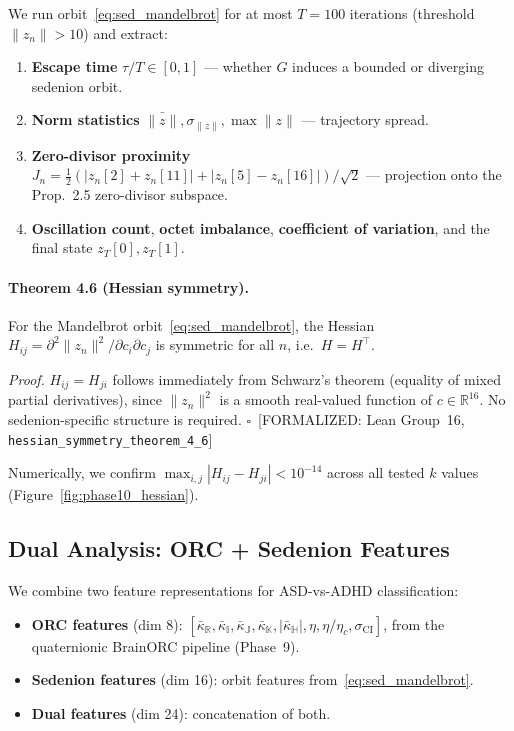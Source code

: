 \documentclass[11pt,a4paper]{article}
\begin{document}
We run orbit~\eqref{eq:sed_mandelbrot} for at most $T=100$ iterations (threshold $\|z_n\| > 10$) and extract:
\begin{enumerate}
\item \textbf{Escape time} $\tau/T \in [0,1]$ --- whether $G$ induces a bounded or diverging sedenion orbit.
\item \textbf{Norm statistics} $\bar{\|z\|}, \sigma_{\|z\|}, \max\|z\|$ --- trajectory spread.
\item \textbf{Zero-divisor proximity} $J_n = \tfrac{1}{2}(|z_n[2]{+}z_n[11]| + |z_n[5]{-}z_n[16]|)/\sqrt{2}$ --- projection onto the Prop.~2.5 zero-divisor subspace.
\item \textbf{Oscillation count}, \textbf{octet imbalance}, \textbf{coefficient of variation}, and the final state $z_T[0], z_T[1]$.
\end{enumerate}

\paragraph{Theorem 4.6 (Hessian symmetry).}
For the Mandelbrot orbit~\eqref{eq:sed_mandelbrot}, the Hessian $H_{ij} = \partial^2 \|z_n\|^2 / \partial c_i \partial c_j$ is symmetric for all $n$, i.e.\ $H = H^\top$.

\textit{Proof.} $H_{ij} = H_{ji}$ follows immediately from Schwarz's theorem (equality of mixed partial derivatives), since $\|z_n\|^2$ is a smooth real-valued function of $c \in \mathbb{R}^{16}$. No sedenion-specific structure is required. $\square$~[FORMALIZED: Lean Group~16, \texttt{hessian\_symmetry\_theorem\_4\_6}]

Numerically, we confirm $\max_{i,j}|H_{ij} - H_{ji}| < 10^{-14}$ across all tested $k$ values (Figure~\ref{fig:phase10_hessian}).

\subsection{Dual Analysis: ORC + Sedenion Features}

We combine two feature representations for ASD-vs-ADHD classification:
\begin{itemize}
\item \textbf{ORC features} (dim 8): $[\bar\kappa_\mathbb{R}, \bar\kappa_\mathbb{I}, \bar\kappa_\mathbb{J}, \bar\kappa_\mathbb{K}, |\bar\kappa_\mathbb{H}|, \eta, \eta/\eta_c, \sigma_\text{CI}]$, from the quaternionic BrainORC pipeline (Phase~9).
\item \textbf{Sedenion features} (dim 16): orbit features from~\eqref{eq:sed_mandelbrot}.
\item \textbf{Dual features} (dim 24): concatenation of both.
\end{itemize}
\end{document}
